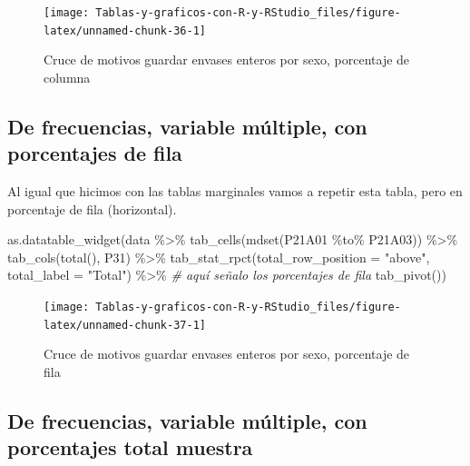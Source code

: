 \documentclass[
]{book}
\newenvironment{Shaded}{\begin{snugshade}}{\end{snugshade}}
\newcommand{\AttributeTok}[1]{\textcolor[rgb]{0.77,0.63,0.00}{#1}}
\newcommand{\CommentTok}[1]{\textcolor[rgb]{0.56,0.35,0.01}{\textit{#1}}}
\newcommand{\FunctionTok}[1]{\textcolor[rgb]{0.00,0.00,0.00}{#1}}
\newcommand{\NormalTok}[1]{#1}
\newcommand{\SpecialCharTok}[1]{\textcolor[rgb]{0.00,0.00,0.00}{#1}}
\newcommand{\StringTok}[1]{\textcolor[rgb]{0.31,0.60,0.02}{#1}}
\begin{document}
\begin{figure}[H]

{\centering \texttt{[image: Tablas-y-graficos-con-R-y-RStudio\_files/figure-latex/unnamed-chunk-36-1]} 

}

\caption{Cruce de motivos guardar envases enteros por sexo, porcentaje de columna}\label{fig:unnamed-chunk-36}
\end{figure}

\hypertarget{de-frecuencias-variable-muxfaltiple-con-porcentajes-de-fila}{%
\subsection{De frecuencias, variable múltiple, con porcentajes de fila}\label{de-frecuencias-variable-muxfaltiple-con-porcentajes-de-fila}}

Al igual que hicimos con las tablas marginales vamos a repetir esta tabla, pero en porcentaje de fila (horizontal).

\begin{Shaded}
\begin{Highlighting}[]
\FunctionTok{as.datatable\_widget}\NormalTok{(data }\SpecialCharTok{\%\textgreater{}\%}
    \FunctionTok{tab\_cells}\NormalTok{(}\FunctionTok{mdset}\NormalTok{(P21A01 }\SpecialCharTok{\%to\%}\NormalTok{ P21A03)) }\SpecialCharTok{\%\textgreater{}\%}
    \FunctionTok{tab\_cols}\NormalTok{(}\FunctionTok{total}\NormalTok{(), P31) }\SpecialCharTok{\%\textgreater{}\%}
    \FunctionTok{tab\_stat\_rpct}\NormalTok{(}\AttributeTok{total\_row\_position =} \StringTok{"above"}\NormalTok{, }\AttributeTok{total\_label =} \StringTok{"Total"}\NormalTok{) }\SpecialCharTok{\%\textgreater{}\%} \CommentTok{\# aquí señalo los porcentajes de fila}
    \FunctionTok{tab\_pivot}\NormalTok{())}
\end{Highlighting}
\end{Shaded}

\begin{figure}[H]

{\centering \texttt{[image: Tablas-y-graficos-con-R-y-RStudio\_files/figure-latex/unnamed-chunk-37-1]} 

}

\caption{Cruce de motivos guardar envases enteros por sexo, porcentaje de fila}\label{fig:unnamed-chunk-37}
\end{figure}

\hypertarget{de-frecuencias-variable-muxfaltiple-con-porcentajes-total-muestra}{%
\subsection{De frecuencias, variable múltiple, con porcentajes total muestra}\label{de-frecuencias-variable-muxfaltiple-con-porcentajes-total-muestra}}
\end{document}
